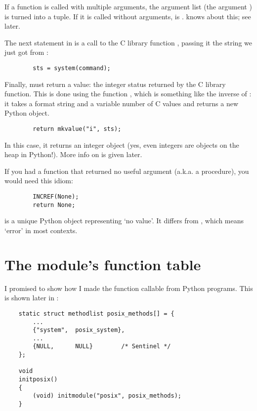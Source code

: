 If a function is called with multiple arguments, the argument list
(the argument ) is turned into a tuple.  If it is called
without arguments,  is .  knows
about this; see later.

The next statement in  is a call to the C library
function , passing it the string we just got from
:

\begin{verbatim}
        sts = system(command);
\end{verbatim}

Finally,  must return a value: the integer status
returned by the C library  function.  This is done
using the function , which is something like the
inverse of : it takes a format string and a variable
number of C values and returns a new Python object.

\begin{verbatim}
        return mkvalue("i", sts);
\end{verbatim}

In this case, it returns an integer object (yes, even integers are
objects on the heap in Python!).  More info on  is
given later.

If you had a function that returned no useful argument (a.k.a. a
procedure), you would need this idiom:

\begin{verbatim}
        INCREF(None);
        return None;
\end{verbatim}

 is a unique Python object representing `no value'.  It
differs from , which means `error' in most contexts.


\section{The module's function table}

I promised to show how I made the function 
callable from Python programs.  This is shown later in
:

\begin{verbatim}
    static struct methodlist posix_methods[] = {
        ...
        {"system",  posix_system},
        ...
        {NULL,      NULL}        /* Sentinel */
    };

    void
    initposix()
    {
        (void) initmodule("posix", posix_methods);
    }
\end{verbatim}

